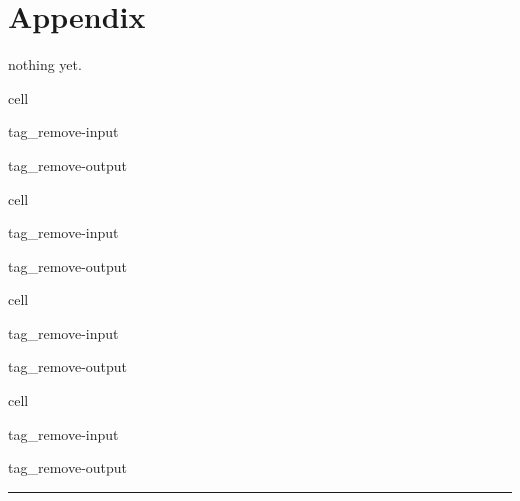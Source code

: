 \documentclass[letterpaper,10pt,english]{jupyterBook}
\begin{document}
\section{Appendix}
\label{\detokenize{ipynb/chapter2:appendix}}
\sphinxAtStartPar
nothing yet.

\begin{sphinxuseclass}{cell}
\begin{sphinxuseclass}{tag_remove-input}
\begin{sphinxuseclass}{tag_remove-output}
\end{sphinxuseclass}
\end{sphinxuseclass}
\end{sphinxuseclass}
\begin{sphinxuseclass}{cell}
\begin{sphinxuseclass}{tag_remove-input}
\begin{sphinxuseclass}{tag_remove-output}
\end{sphinxuseclass}
\end{sphinxuseclass}
\end{sphinxuseclass}
\begin{sphinxuseclass}{cell}
\begin{sphinxuseclass}{tag_remove-input}
\begin{sphinxuseclass}{tag_remove-output}
\end{sphinxuseclass}
\end{sphinxuseclass}
\end{sphinxuseclass}
\begin{sphinxuseclass}{cell}
\begin{sphinxuseclass}{tag_remove-input}
\begin{sphinxuseclass}{tag_remove-output}
\end{sphinxuseclass}
\end{sphinxuseclass}
\end{sphinxuseclass}

\bigskip\hrule\bigskip








\renewcommand{\indexname}{Index}
\printindex
\end{document}
